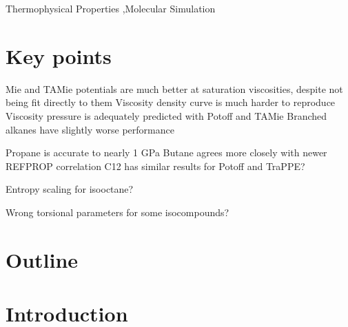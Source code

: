 \documentclass[preprint,review,12pt]{elsarticle}
\begin{document}
\begin{frontmatter}
\begin{abstract}
	
	
\end{abstract}

\begin{keyword}
	
	
	
	Thermophysical Properties \sep Molecular Simulation
	
\end{keyword}

\end{frontmatter}	
	
\section*{Key points}

Mie and TAMie potentials are much better at saturation viscosities, despite not being fit directly to them
Viscosity density curve is much harder to reproduce
Viscosity pressure is adequately predicted with Potoff and TAMie
Branched alkanes have slightly worse performance

Propane is accurate to nearly 1 GPa
Butane agrees more closely with newer REFPROP correlation
C12 has similar results for Potoff and TraPPE?

Entropy scaling for isooctane?

Wrong torsional parameters for some isocompounds?

\section*{Outline}

\section{Introduction}
\end{document}
